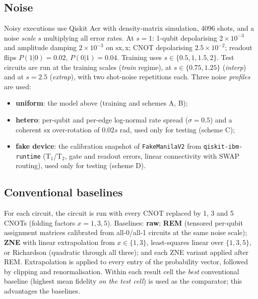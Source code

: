 \documentclass[11pt]{article}
\begin{document}
\subsection{Noise}
Noisy executions use Qiskit Aer \citep{qiskit2024} with density-matrix simulation, 4096 shots, and a noise \emph{scale} $s$ multiplying all error rates. At $s=1$: 1-qubit depolarising $2\times10^{-3}$ and amplitude damping $2\times10^{-3}$ on $\mathrm{sx},\mathrm{x}$; CNOT depolarising $2.5\times10^{-2}$; readout flips $P(1|0)=0.02$, $P(0|1)=0.04$. Training uses $s\in\{0.5,1,1.5,2\}$. Test circuits are run at the training scales (\emph{train} regime), at $s\in\{0.75,1.25\}$ (\emph{interp}) and at $s=2.5$ (\emph{extrap}), with two shot-noise repetitions each. Three noise \emph{profiles} are used:
\begin{itemize}
\item \textbf{uniform}: the model above (training and schemes A, B);
\item \textbf{hetero}: per-qubit and per-edge log-normal rate spread ($\sigma=0.5$) and a coherent $\mathrm{sx}$ over-rotation of $0.02s$ rad, used only for testing (scheme C);
\item \textbf{fake device}: the calibration snapshot of \texttt{FakeManilaV2} from \texttt{qiskit-ibm-runtime} (T$_1$/T$_2$, gate and readout errors, linear connectivity with SWAP routing), used only for testing (scheme D).
\end{itemize}

\subsection{Conventional baselines}
For each circuit, the circuit is run with every CNOT replaced by 1, 3 and 5 CNOTs (folding factors $x=1,3,5$). Baselines: \textbf{raw}; \textbf{REM} (tensored per-qubit assignment matrices calibrated from all-0/all-1 circuits at the same noise scale); \textbf{ZNE} with linear extrapolation from $x\in\{1,3\}$, least-squares linear over $\{1,3,5\}$, or Richardson (quadratic through all three); and each ZNE variant applied after REM. Extrapolation is applied to every entry of the probability vector, followed by clipping and renormalisation. Within each result cell the \emph{best} conventional baseline (highest mean fidelity \emph{on the test cell}) is used as the comparator; this advantages the baselines.
\end{document}
